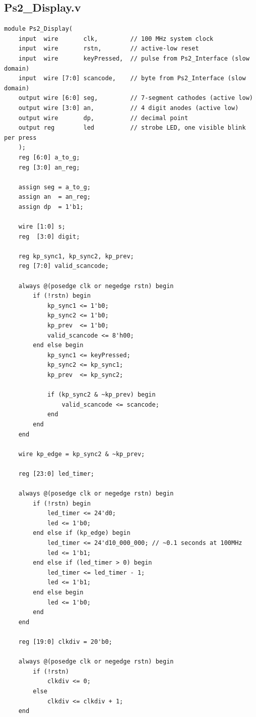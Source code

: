\documentclass[11pt,a4paper]{article}
\begin{document}
\subsection*{Ps2\_Display.v}
\begin{lstlisting}
module Ps2_Display(
    input  wire       clk,         // 100 MHz system clock
    input  wire       rstn,        // active-low reset
    input  wire       keyPressed,  // pulse from Ps2_Interface (slow domain)
    input  wire [7:0] scancode,    // byte from Ps2_Interface (slow domain)
    output wire [6:0] seg,         // 7-segment cathodes (active low)
    output wire [3:0] an,          // 4 digit anodes (active low)
    output wire       dp,          // decimal point
    output reg        led          // strobe LED, one visible blink per press
    );
    reg [6:0] a_to_g;
    reg [3:0] an_reg;

    assign seg = a_to_g;
    assign an  = an_reg;
    assign dp  = 1'b1;
    
    wire [1:0] s;    
    reg  [3:0] digit;

    reg kp_sync1, kp_sync2, kp_prev;
    reg [7:0] valid_scancode;
    
    always @(posedge clk or negedge rstn) begin
        if (!rstn) begin
            kp_sync1 <= 1'b0;
            kp_sync2 <= 1'b0;
            kp_prev  <= 1'b0;
            valid_scancode <= 8'h00;
        end else begin
            kp_sync1 <= keyPressed;
            kp_sync2 <= kp_sync1;
            kp_prev  <= kp_sync2;

            if (kp_sync2 & ~kp_prev) begin
                valid_scancode <= scancode;
            end
        end
    end
    
    wire kp_edge = kp_sync2 & ~kp_prev;

    reg [23:0] led_timer;
    
    always @(posedge clk or negedge rstn) begin
        if (!rstn) begin
            led_timer <= 24'd0;
            led <= 1'b0;
        end else if (kp_edge) begin
            led_timer <= 24'd10_000_000; // ~0.1 seconds at 100MHz
            led <= 1'b1;
        end else if (led_timer > 0) begin
            led_timer <= led_timer - 1;
            led <= 1'b1;
        end else begin
            led <= 1'b0;
        end
    end

    reg [19:0] clkdiv = 20'b0;
    
    always @(posedge clk or negedge rstn) begin
        if (!rstn)
            clkdiv <= 0;
        else
            clkdiv <= clkdiv + 1;
    end
    

\end{lstlisting}
\end{document}
